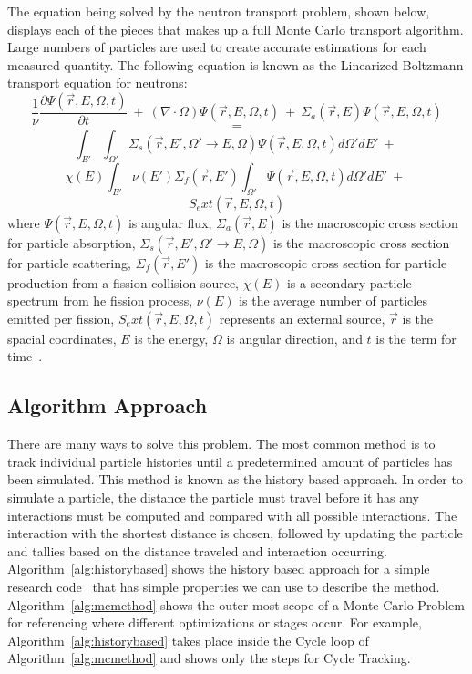 %
The equation being solved by the neutron transport problem, shown below, displays each of the pieces that makes up a full Monte Carlo transport algorithm.
%
Large numbers of particles are used to create accurate estimations for each measured quantity.
%
The following equation is known as the Linearized Boltzmann transport equation for neutrons:
%
$$
\frac{1}{\nu} \frac{ \partial \Psi ( \vec{r}, E, \Omega, t ) }{\partial t}\ +\ 
(\nabla \cdot \Omega ) \Psi ( \vec{r}, E, \Omega, t )\ +\ 
\Sigma_a (\vec{r}, E ) \Psi ( \vec{r}, E, \Omega, t )
$$
$$=$$
$$
\int _{E '} \int _{\Omega '} \Sigma_{s} ( \vec{r}, E', \Omega ' \rightarrow E, \Omega ) \Psi (\vec{r}, E, \Omega, t) d \Omega ' dE'\ +\ 
$$
$$
\chi (E) \int _{E'} \nu (E') \Sigma_{f} (\vec{r},E') \int _{\Omega '} \Psi ( \vec{r}, E, \Omega, t ) d \Omega ' dE'\ +\ $$
$$
S_ext(\vec{r}, E, \Omega, t )
$$
%
where $ \Psi ( \vec{r}, E, \Omega, t ) $ is angular flux, 
$\Sigma_a (\vec{r}, E )$ is the macroscopic cross section for particle absorption, 
$\Sigma_{s} ( \vec{r}, E', \Omega ' \rightarrow E, \Omega )$ is the macroscopic cross section for particle scattering,
$\Sigma_{f} (\vec{r},E') $ is the macroscopic cross section for particle production from a fission collision source,
$\chi (E)$ is a secondary particle spectrum from he fission process,
$\nu (E)$ is the average number of particles emitted per fission,
$S_ext(\vec{r}, E, \Omega, t )$ represents an external source,
$\vec{r}$ is the spacial coordinates,
$E$ is the energy,
$\Omega$ is angular direction,
and $t$ is the term for time~\cite{gentileMCPTAPO}.
%

\subsection{ \textbf{ Algorithm Approach} }

There are many ways to solve this problem.
%
The most common method is to track individual particle histories until a predetermined amount of particles has been simulated.
%
This method is known as the history based approach.
%
In order to simulate a particle, the distance the particle must travel before it has any interactions must be computed and compared with all possible interactions.
%
The interaction with the shortest distance is chosen, followed by updating the particle and tallies based on the distance traveled and interaction occurring.
% 
Algorithm~\ref{alg:historybased} shows the history based approach for a simple research code~\cite{alpsmc1} that has simple properties we can use to describe the method.
%
Algorithm~\ref{alg:mcmethod} shows the outer most scope of a Monte Carlo Problem for referencing where different optimizations or stages occur.
%
For example, Algorithm~\ref{alg:historybased} takes place inside the Cycle loop of Algorithm~\ref{alg:mcmethod} and shows only the steps for Cycle Tracking.

